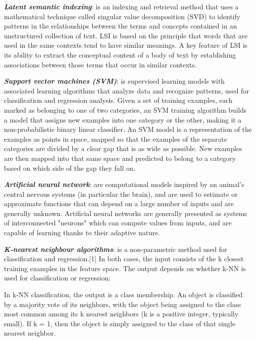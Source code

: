 \documentclass[12pt]{book}
\begin{document}
\begin{enumerate*}
  \item \textbf{\textit {Latent semantic indexing}}: is an indexing and retrieval method that uses a mathematical technique called singular value decomposition (SVD) to identify patterns in the relationships between the terms and concepts contained in an unstructured collection of text. LSI is based on the principle that words that are used in the same contexts tend to have similar meanings. A key feature of LSI is its ability to extract the conceptual content of a body of text by establishing associations between those terms that occur in similar contexts.
  \item \textbf{\textit {Support vector machines (SVM)}}: is  supervised learning models with associated learning algorithms that analyze data and recognize patterns, used for classification and regression analysis. Given a set of training examples, each marked as belonging to one of two categories, an SVM training algorithm builds a model that assigns new examples into one category or the other, making it a non-probabilistic binary linear classifier. An SVM model is a representation of the examples as points in space, mapped so that the examples of the separate categories are divided by a clear gap that is as wide as possible. New examples are then mapped into that same space and predicted to belong to a category based on which side of the gap they fall on.
  \item \textbf{\textit {Artificial neural network}}: are computational models inspired by an animal's central nervous systems (in particular the brain), and are used to estimate or approximate functions that can depend on a large number of inputs and are generally unknown. Artificial neural networks are generally presented as systems of interconnected "neurons" which can compute values from inputs, and are capable of learning thanks to their adaptive nature.
  \item \textbf{\textit {K-nearest neighbour algorithms}}:  is a non-parametric method used for classification and regression.[1] In both cases, the input consists of the k closest training examples in the feature space. The output depends on whether k-NN is used for classification or regression:
	\begin{itemize*}
	  \item In k-NN classification, the output is a class membership. An object is classified by a majority vote of its neighbors, with the object being assigned to the class most common among its k nearest neighbors (k is a positive integer, typically small). If k = 1, then the object is simply assigned to the class of that single nearest neighbor.

\end{itemize*}
\end{enumerate*}
\end{document}
